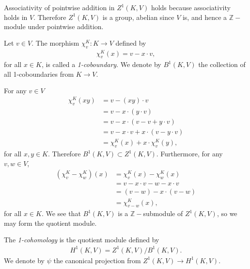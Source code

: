 Associativity of pointwise addition in $Z^1(K, V)$ holds because associativity holds in $V$. Therefore $Z^1\left(K, V\right)$ is a group, abelian since $V$ is, and hence a $\mathbb{Z}-$module under pointwise addition.

\begin{definition} Let $v \in V$. The morphism $\chi^K_v:K\rightarrow V$ defined by
\begin{align*}
	\chi^K_v (x) = v - x\cdot v,
\end{align*}
for all $x \in K$, is called a \emph{1-coboundary}. We denote by $B^1\left(K, V\right)$ the collection of all 1-coboundaries from $K \rightarrow V$. 
\end{definition}

For any $v \in V$
\begin{align*}
	\chi^K_v(xy) &=  v - (xy)\cdot v \\
	&=  v - x \cdot \left(y\cdot v \right)\\
	&=  v - x \cdot \left(v -v + y\cdot v \right)\\
	&=  v - x\cdot v + x\cdot \left( v - y\cdot v\right)\\
	&=  \chi^K_v(x) + x\cdot \chi^K_v(y),
\end{align*}
for all $x, y \in K$. Therefore $B^1(K, V) \subset Z^1(K, V)$. Furthermore, for any $v, w \in V$,
\begin{align*}
	(\chi^K_v - \chi^K_w)(x) &=  \chi^K_v(x) - \chi^K_w(x)\\
	&=  v - x \cdot v - w - x\cdot v \\
	&=  (v - w) - x\cdot (v - w) \\
	&=  \chi^K_{v - w} (x),
\end{align*}
for all $x \in K$. We see that $B^1\left(K, V\right)$ is a $\mathbb{Z}-$submodule of $Z^1(K, V)$, so we may form the quotient module.

\begin{definition} The \emph{1-cohomology} is the quotient module defined by
\begin{align*}
	H^1\left(K, V\right) = Z^1\left(K, V\right) / B^1\left(K, V\right).
\end{align*}
We denote by $\psi$ the canonical projection from $Z^1(K, V)\rightarrow H^1(K, V)$.
\end{definition}

